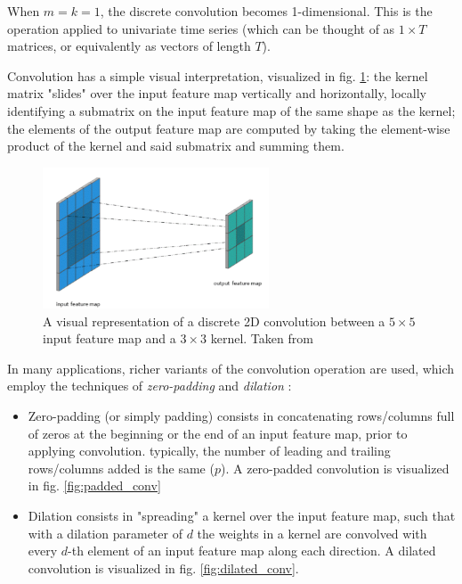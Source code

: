 \begin{remark}
When $m=k=1$, the discrete convolution becomes 1-dimensional. This is the operation applied to univariate time series (which can be thought of as $1\times T$ matrices, or equivalently as vectors of length $T$).
\end{remark}

Convolution has a simple visual interpretation, visualized in fig. \ref{fig:convolution}: the kernel matrix "slides" over the input feature map vertically and horizontally, locally identifying a submatrix on the input feature map of the same shape as the kernel; the elements of the output feature map are computed by taking the element-wise product of the kernel and said submatrix and summing them.

\begin{figure}
    \centering
    \includegraphics[width=0.6\textwidth]{images/convolution}
    \caption[Discrete convolution]{A visual representation of a discrete 2D convolution between a $5\times5$ input feature map and a $3\times3$ kernel. Taken from \cite{conv_fig}}
    \label{fig:convolution}
\end{figure}

In many applications, richer variants of the convolution operation are used, which employ the techniques of \textit{zero-padding} and \textit{dilation} \cite{dl_book}:

\begin{itemize}
\item Zero-padding (or simply padding) consists in concatenating rows/columns full of zeros at the beginning or the end of an input feature map, prior to applying convolution. typically, the number of leading and trailing rows/columns added is the same ($p$). A zero-padded convolution is visualized in fig. \ref{fig:padded_conv}
\item Dilation consists in "spreading" a kernel over the input feature map, such that with a dilation parameter of $d$ the weights in a kernel are convolved with every $d$-th element of an input feature map along each direction. A dilated convolution is visualized in fig. \ref{fig:dilated_conv}.
\end{itemize}


